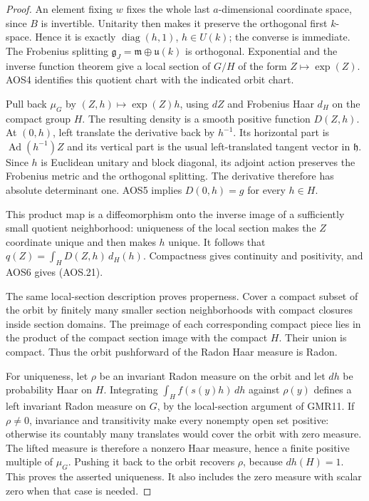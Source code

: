 \begin{proof}
An element fixing $w$ fixes the whole last $a$-dimensional coordinate
space, since $B$ is invertible.  Unitarity then makes it preserve
the orthogonal first $k$-space.  Hence it is exactly
$\operatorname{diag}(h,1)$, $h\in U(k)$; the converse is immediate.
The Frobenius splitting
$\mathfrak g_J=\mathfrak m\oplus\mathfrak u(k)$ is orthogonal.
Exponential and the inverse function theorem give a local section of
$G/H$ of the form $Z\mapsto\exp(Z)$.  AOS4 identifies this quotient
chart with the indicated orbit chart.

Pull back $\mu_G$ by $(Z,h)\mapsto\exp(Z)h$, using $dZ$ and
Frobenius Haar $d_H$ on the compact group $H$.  The resulting density
is a smooth positive function $D(Z,h)$.  At $(0,h)$, left translate
the derivative back by $h^{-1}$.  Its horizontal part is
$\operatorname{Ad}(h^{-1})Z$ and its vertical part is the usual
left-translated tangent vector in $\mathfrak h$.  Since $h$ is
Euclidean unitary and block diagonal, its adjoint action preserves
the Frobenius metric and the orthogonal splitting.  The derivative
therefore has absolute determinant one.  AOS5 implies
$D(0,h)=g$ for every $h\in H$.

This product map is a diffeomorphism onto the inverse image of a
sufficiently small quotient neighborhood: uniqueness of the local
section makes the $Z$ coordinate unique and then makes $h$ unique.
It follows that $q(Z)=\int_H D(Z,h)\,d_H(h)$.  Compactness gives
continuity and positivity, and AOS6 gives (AOS.21).

The same local-section description proves properness.  Cover a
compact subset of the orbit by finitely many smaller section
neighborhoods with compact closures inside section domains.  The
preimage of each corresponding compact piece lies in the product
of the compact section image with the compact $H$.  Their union is
compact.  Thus the orbit pushforward of the Radon Haar measure is
Radon.

For uniqueness, let $\rho$ be an invariant Radon measure on the
orbit and let $dh$ be probability Haar on $H$.  Integrating
$\int_H f(s(y)h)\,dh$ against $\rho(y)$ defines a left invariant
Radon measure on $G$, by the local-section argument of GMR11.
If $\rho\ne0$, invariance and transitivity make every nonempty open
set positive: otherwise its countably many translates would cover
the orbit with zero measure.  The lifted measure is therefore a
nonzero Haar measure, hence a finite positive multiple of $\mu_G$.
Pushing it back to the orbit recovers $\rho$, because $dh(H)=1$.
This proves the asserted uniqueness.  It also includes the zero
measure with scalar zero when that case is needed.
\end{proof}

